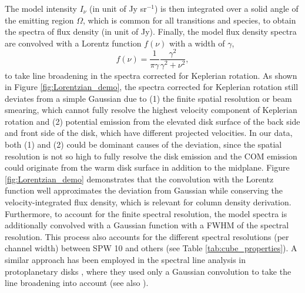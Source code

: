 \documentclass[linenumbers, twocolumn, twocolappendix, astrosymb, times]{aastex631}
\begin{document}
The model intensity $I_\nu$ (in unit of Jy sr$^{-1}$) is then integrated over a solid angle of the emitting region $\Omega$, which is common for all transitions and species, to obtain the spectra of flux density (in unit of Jy). 
Finally, the model flux density spectra are convolved with a Lorentz function $f(\nu)$ with a width of $\gamma$,
\begin{equation}
    f(\nu) = \frac{1}{\pi\gamma} \frac{\gamma^2}{\gamma^2 + \nu^2},
\end{equation}
to take line broadening in the spectra corrected for Keplerian rotation. As shown in Figure \ref{fig:Lorentzian_demo}, the spectra corrected for Keplerian rotation still deviates from a simple Gaussian due to (1) the finite spatial resolution or beam smearing, which cannot fully resolve the highest velocity component of Keplerian rotation and (2) potential emission from the elevated disk surface of the back side and front side of the disk, which have different projected velocities. In our data, both (1) and (2) could be dominant causes of the deviation, since the spatial resolution is not so high to fully resolve the disk emission and the COM emission could originate from the warm disk surface in addition to the midplane.
Figure \ref{fig:Lorentzian_demo} demonstrates that the convolution with the Lorentz function well approximates the deviation from Gaussian while conserving the velocity-integrated flux density, which is relevant for column density derivation. Furthermore, to account for the finite spectral resolution, the model spectra is additionally convolved with a Gaussian function with a FWHM of the spectral resolution. This process also accounts for the different spectral resolutions (per channel width) between SPW 10 and others (see Table \ref{tab:cube_properties}). A similar approach has been employed in the spectral line analysis in protoplanetary disks \citep{Cataldi2021}, where they used only a Gaussian convolution to take the line broadening into account (see also \citealt{Bergner2021, Guzman2021}).



\end{document}
